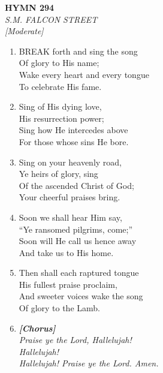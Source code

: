 \newpage
\begin{center}
    {\Large \textbf{HYMN 294}}
    \\
    \textit{S.M. FALCON STREET}
    \\
    \textit{\small [Moderate]}
\end{center}
\vspace{1em}

\begin{enumerate}
    \item BREAK forth and sing the song \\
        Of glory to His name; \\
        Wake every heart and every tongue \\
        To celebrate His fame.

    \item Sing of His dying love, \\
        His resurrection power; \\
        Sing how He intercedes above \\
        For those whose sins He bore.

    \item Sing on your heavenly road, \\
        Ye heirs of glory, sing \\
        Of the ascended Christ of God; \\
        Your cheerful praises bring.

    \item Soon we shall hear Him say, \\
        ``Ye ransomed pilgrims, come;'' \\
        Soon will He call us hence away \\
        And take us to His home.

    \item Then shall each raptured tongue \\
        His fullest praise proclaim, \\
        And sweeter voices wake the song \\
        Of glory to the Lamb.

    \item[] \vspace{0.4em}
    \textbf{\textit{[Chorus]}} \\
    \textit{Praise ye the Lord, Hallelujah!} \\
    \textit{Hallelujah!} \\
    \textit{Hallelujah! Praise ye the Lord. Amen.}
    \vspace{0.4em}

\end{enumerate}

